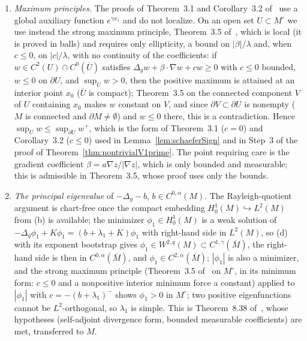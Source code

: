 \documentclass[11pt]{article}
\theoremstyle{plain}
\theoremstyle{definition}
\theoremstyle{remark}
\begin{document}
\begin{enumerate}[label=(\alph*)]
\item \emph{Maximum principles.} The proofs of Theorem~3.1 and Corollary~3.2 of~\cite{GilbargTrudinger2001} use a global auxiliary function \(e^{\gamma x_1}\) and do not localize. On an open set \(U\subset M^\circ\) we use instead the strong maximum principle, Theorem~3.5 of~\cite{GilbargTrudinger2001}, which is local (it is proved in balls) and requires only ellipticity, a bound on \(|\beta|/\lambda\) and, when \(c\le 0\), on \(|c|/\lambda\), with no continuity of the coefficients: if \(w\in C^2(U)\cap C^0(\overline U)\) satisfies \(\Delta_g w+\beta\cdot\nabla w+cw\ge 0\) with \(c\le 0\) bounded, \(w\le 0\) on \(\partial U\), and \(\sup_U w>0\), then the positive maximum is attained at an interior point \(x_0\) (\(\overline U\) is compact); Theorem~3.5 on the connected component \(V\) of \(U\) containing \(x_0\) makes \(w\) constant on \(V\), and since \(\partial V\subset\partial U\) is nonempty (\(M\) is connected and \(\partial M\neq\emptyset\)) and \(w\le 0\) there, this is a contradiction. Hence \(\sup_U w\le\sup_{\partial U}w^+\), which is the form of Theorem~3.1 (\(c=0\)) and Corollary~3.2 (\(c\le 0\)) used in Lemma~\ref{lem:schaeferSign} and in Step~3 of the proof of Theorem~\ref{thm:nontrivialV1prime}. The point requiring care is the gradient coefficient \(\beta=a\nabla z/|\nabla z|\), which is only bounded and measurable; this is admissible in Theorem~3.5, whose proof uses only the bounds.
\item \emph{The principal eigenvalue} of \(-\Delta_g-b\), \(b\in C^{0,\alpha}(M)\). The Rayleigh-quotient argument is chart-free once the compact embedding \(H^1_0(M)\hookrightarrow L^2(M)\) from (b) is available; the minimizer \(\phi_1\in H^1_0(M)\) is a weak solution of \(-\Delta_g\phi_1+K\phi_1=(b+\lambda_1+K)\phi_1\) with right-hand side in \(L^2(M)\), so (d) with its exponent bootstrap gives \(\phi_1\in W^{2,q}(M)\subset C^{1,\gamma}(\overline M)\), the right-hand side is then in \(C^{0,\alpha}(\overline M)\), and \(\phi_1\in C^{2,\alpha}(\overline M)\); \(|\phi_1|\) is also a minimizer, and the strong maximum principle (Theorem~3.5 of~\cite{GilbargTrudinger2001} on \(M^\circ\), in its minimum form: \(c\le 0\) and a nonpositive interior minimum force a constant) applied to \(|\phi_1|\) with \(c=-(b+\lambda_1)^-\) shows \(\phi_1>0\) in \(M^\circ\); two positive eigenfunctions cannot be \(L^2\)-orthogonal, so \(\lambda_1\) is simple. This is Theorem~8.38 of~\cite{GilbargTrudinger2001}, whose hypotheses (self-adjoint divergence form, bounded measurable coefficients) are met, transferred to \(M\).
\end{enumerate}
\end{document}
